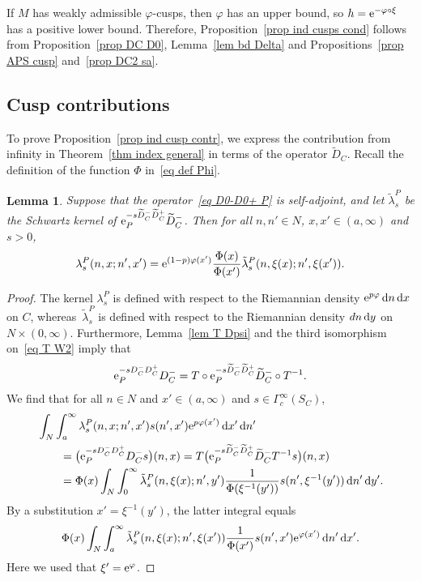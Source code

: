 \documentclass[10pt,a4paper]{amsart}
\numberwithin{equation}{section}
\newtheorem{Lemma}[Theorem]{Lemma}
\begin{document}
If $M$ has weakly admissible $\varphi$-cusps, then $\varphi$ has an upper bound, so $h = {\rm e}^{-\varphi \circ \xi}$ has a positive lower bound. Therefore,
Proposition~\ref{prop ind cusps cond} follows from
Proposition~\ref{prop DC D0}, Lemma~\ref{lem bd Delta} and Propositions~\ref{prop APS cusp} and~\ref{prop DC2 sa}.

\subsection{Cusp contributions}\label{sec cusp contr}

To prove Proposition~\ref{prop ind cusp contr}, we express the contribution from infinity in Theorem~\ref{thm index general} in terms of the operator $\widetilde{D}_C$. Recall the definition of the function $\Phi$ in~\eqref{eq def Phi}.
\begin{Lemma}\label{lem lambda lambda tilde}
Suppose that the operator~\eqref{eq D0-D0+ P} is self-adjoint, and
let $\tilde \lambda_s^{P}$ be the Schwartz kernel of ${\rm e}_P^{-s \widetilde{D}_C^- \widetilde{D}_C^+} \widetilde{D}_C^-$. Then
for all $n,n' \in N$, $x,x' \in (a, \infty)$ and $s>0$,
\[
\lambda_s^{P}(n, x; n', x') = {\rm e}^{(1-p)\varphi(x')} \frac{\Phi(x)}{\Phi(x')} \tilde \lambda_s^{P}(n, \xi(x); n', \xi(x')).
\]
\end{Lemma}
\begin{proof}
The kernel $ \lambda_s^{P}$ is defined with respect to the Riemannian density ${\rm e}^{p\varphi}\, {\rm d}n \, {\rm d}x$ on $C$, whereas~$\tilde \lambda_s^{P}$ is defined with respect to the Riemannian density $dn \, {\rm d}y$ on $N \times (0, \infty)$. Furthermore, Lemma~\ref{lem T Dpsi} and the third isomorphism on~\eqref{eq T W2} imply that
\[
{\rm e}_P^{-s D_C^- D_C^+}D_C^- =
 T \circ {\rm e}_P^{-s \widetilde{D}_C^- \widetilde{D}_C^+} \widetilde{D}_C^-\circ T^{-1}.
\]
We find that for all $n \in N$ and $x' \in (a,\infty)$ and $s \in \Gamma^{\infty}_c(S_C)$,
\begin{align*}
\begin{split}
&\int_N \int_a^{\infty} \lambda_s^{P}(n, x; n', x') s(n', x') {\rm e}^{p\varphi(x')}\, {\rm d}x' \, {\rm d}n' \\
&\qquad{}= \bigl({\rm e}_P^{-s D_C^- D_C^+}D_C^-s \bigr)(n, x)
= T \bigl({\rm e}_P^{-s \widetilde{D}_C^- \widetilde{D}_C^+} \widetilde{D}_C^- T^{-1}s \bigr)(n, x)
\\
&\qquad{}= \Phi(x) \int_N \int_0^{\infty} \tilde \lambda_s^{P}(n, \xi(x); n', y') \frac{1}{\Phi(\xi^{-1}(y'))} s(n', \xi^{-1}(y'))
\, {\rm d}n'\, {\rm d}y'.
\end{split}
\end{align*}
By a substitution $x' = \xi^{-1}(y')$, the latter integral equals
\[
 \Phi(x) \int_N \int_a^{\infty} \tilde \lambda_s^{P}(n, \xi(x); n', \xi(x')) \frac{1}{\Phi(x')} s(n', x') {\rm e}^{\varphi(x')}
\, {\rm d}n'\, {\rm d}x'.
\]
Here we used that $\xi' = {\rm e}^{\varphi}$.
\end{proof}
\end{document}
